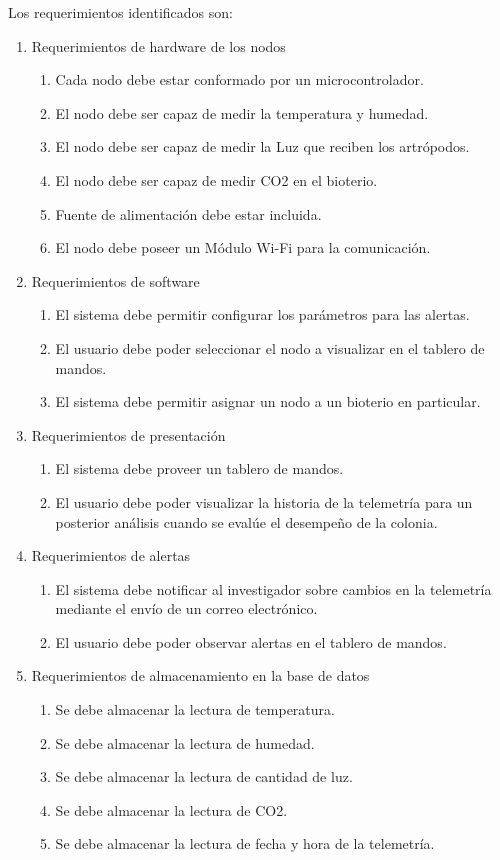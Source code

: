 \documentclass[
11pt, %
]{charter}
\begin{document}
Los requerimientos identificados son:
\begin{enumerate}
	\item Requerimientos de hardware de los nodos
		\begin{enumerate}
			\item Cada nodo debe estar conformado por un microcontrolador.
			\item El nodo debe ser capaz de medir la temperatura y humedad.
			\item El nodo debe ser capaz de medir la Luz que reciben los artrópodos.
			\item El nodo debe ser capaz de medir CO2 en el bioterio.
			\item Fuente de alimentación debe estar incluida.
			\item El nodo debe poseer un Módulo Wi-Fi para la comunicación.
		\end{enumerate}
	\item Requerimientos de software
		\begin{enumerate}
			\item El sistema debe permitir configurar los parámetros para las alertas.
			\item El usuario debe poder seleccionar el nodo a visualizar en el tablero de mandos.
			\item El sistema debe permitir asignar un nodo a un bioterio en particular.
		\end{enumerate}
	\item Requerimientos de presentación
		\begin{enumerate}
			\item El sistema debe proveer un tablero de mandos.
			\item El usuario debe poder visualizar la historia de la telemetría para un posterior análisis cuando se evalúe el desempeño de la colonia.
		\end{enumerate}
	\item Requerimientos de alertas
		\begin{enumerate}
			\item El sistema debe notificar al investigador sobre cambios en la telemetría mediante el envío de un correo electrónico.
			\item El usuario debe poder observar alertas en el tablero de mandos.
		\end{enumerate}
	\item Requerimientos de almacenamiento en la base de datos
		\begin{enumerate}
			\item Se debe almacenar la lectura de temperatura.
			\item Se debe almacenar la lectura de humedad.
			\item Se debe almacenar la lectura de cantidad de luz.
			\item Se debe almacenar la lectura de CO2.
			\item Se debe almacenar la lectura de fecha y hora de la telemetría.
		\end{enumerate}
\end{enumerate}
\end{document}
